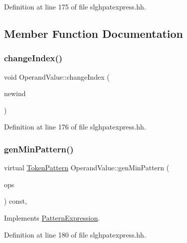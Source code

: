Definition at line 175 of file slghpatexpress.\+hh.



\subsection{Member Function Documentation}
\mbox{\label{class_operand_value_aeaca8cd698f9e9d722c0d4bbb6e53953}} 
\subsubsection{\texorpdfstring{changeIndex()}{changeIndex()}}
{\footnotesize\ttfamily void Operand\+Value\+::change\+Index (\begin{DoxyParamCaption}\item[{int4}]{newind }\end{DoxyParamCaption})\hspace{0.3cm}{\ttfamily [inline]}}



Definition at line 176 of file slghpatexpress.\+hh.

\mbox{\label{class_operand_value_ad483d53c77f85d1042bbb05749c07a20}} 
\subsubsection{\texorpdfstring{genMinPattern()}{genMinPattern()}}
{\footnotesize\ttfamily virtual \mbox{\hyperlink{class_token_pattern}{Token\+Pattern}} Operand\+Value\+::gen\+Min\+Pattern (\begin{DoxyParamCaption}\item[{const vector$<$ \mbox{\hyperlink{class_token_pattern}{Token\+Pattern}} $>$ \&}]{ops }\end{DoxyParamCaption}) const\hspace{0.3cm}{\ttfamily [inline]}, {\ttfamily [virtual]}}



Implements \mbox{\hyperlink{class_pattern_expression_a1dc2d0c07f64fdab9da6c0849e992b50}{Pattern\+Expression}}.



Definition at line 180 of file slghpatexpress.\+hh.

